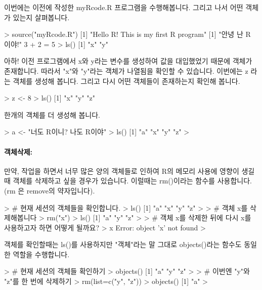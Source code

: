 이번에는 이전에 작성한 myRcode.R 프로그램을 수행해봅니다.
그리고 나서 어떤 객체가 있는지 살펴봅니다.
\begin{Schunk}
\begin{Soutput}
> source("myRcode.R")
[1] "Hello R!  This is my first R program"
[1] "안녕 난 R 이야!"
3 + 2 = 5 
> ls()
[1] "x" "y"
\end{Soutput}
\end{Schunk}

아하! 이전 프로그램에서 x와 y라는 변수를 생성하여 값을 대입했었기 때문에 객체가 존재합니다. 
따라서 "x"와 "y"라는 객체가 나열됨을 확인할 수 있습니다.
이번에는 z 라는 객체를 생성해 봅니다.
그리고 다시 어떤 객체들이 존재하는지 확인해 봅니다. 

\begin{Schunk}
\begin{Soutput}
> z <- 8
> ls()
[1] "x" "y" "z"
\end{Soutput}
\end{Schunk}

한개의 객체를 더 생성해 봅니다. 

\begin{Schunk}
\begin{Soutput}
> a <- "너도 R이니?  나도 R이야"
> ls()
[1] "a" "x" "y" "z"
> 
\end{Soutput}
\end{Schunk}

\paragraph{객체삭제:} 만약, 작업을 하면서 너무 많은 양의 객체들로 인하여 R의 메모리 사용에 영향이 생길때 객체를 삭제하고 싶을 경우가 있습니다. 
이럴때는 rm()이라는 함수를 사용합니다.  
(rm 은 remove의 약자입니다).

\begin{Schunk}
\begin{Soutput}
> # 현재 세션의 객체들을 확인합니다. 
> ls()
[1] "a" "x" "y" "z"
>
> # 객체 x를 삭제해봅니다 
> rm("x")
> ls()
[1] "a" "y" "z"
> 
> # 객체 x를 삭제한 뒤에 다시 x를 사용하고자 하면 어떻게 될까요?
> x
Error: object 'x' not found
> 
\end{Soutput}
\end{Schunk}

객체를 확인할때는 ls()를 사용하지만 "객체"라는 말 그대로 objects()라는 함수도 동일한 역할을 수행합니다. 

\begin{Schunk}
\begin{Soutput}
	
> # 현재 세션의 객체들 확인하기 
> objects()
[1] "a" "y" "z"
>
> # 이번엔 "y"와 "z"를 한 번에 삭제하기 
> rm(list=c("y", "z"))
> objects()
[1] "a"
> 
\end{Soutput}
\end{Schunk}

